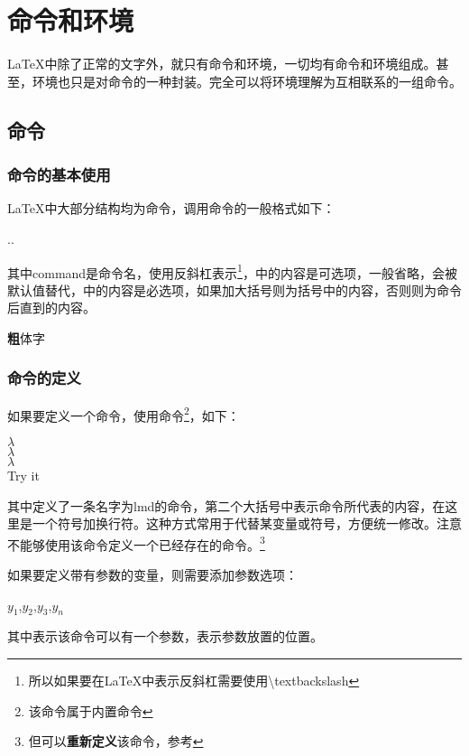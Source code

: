 \section{命令和环境}\label{sec:comm-envi}
    \LaTeX{}中除了正常的文字外，就只有命令和环境，一切均有命令和环境组成。甚至，环境也只是对命令的一种封装。完全可以将环境理解为互相联系的一组命令。
    \subsection{命令}
    \subsubsection{命令的基本使用}
    \LaTeX{}中大部分结构均为命令，调用命令的一般格式如下：
    \begin{texcode}
        \command[]{}{}..{}
    \end{texcode}
    其中command是命令名，使用反斜杠表示\footnote{所以如果要在\LaTeX{}中表示反斜杠需要使用\textbackslash{}textbackslash}，\highunderline{[]}中的内容是可选项，一般省略，会被默认值替代，\highunderline{\{\}}中的内容是必选项，如果加大括号则为括号中的内容，否则则为命令后直到的内容。

    \begin{texshow}
        \textbf 粗体字
    \end{texshow}
    \subsubsection{命令的定义}
    如果要定义一个命令，使用命令\footnote{该命令属于内置命令}，如下：
    
    \begin{texshow}
        \newcommand{\lmd}{$\lambda$\\}
        \lmd\lmd{}\lmd{Try it}
    \end{texshow}

    其中定义了一条名字为lmd的命令，第二个大括号中表示命令所代表的内容，在这里是一个符号加换行符。这种方式常用于代替某变量或符号，方便统一修改。注意不能够使用该命令定义一个已经存在的命令。\footnote{但可以\textbf{重新定义}该命令，参考}

    如果要定义带有参数的变量，则需要添加参数选项：
    \begin{texshow}
        \newcommand{\myy}[1]{$y_{#1}$}
        \myy{1},\myy{2},\myy{3},\myy{n}
    \end{texshow}
    其中\highunderline{[1]}表示该命令可以有一个参数，表示参数放置的位置。

